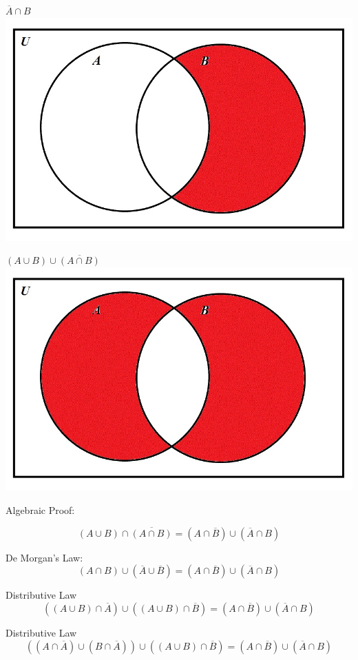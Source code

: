 \documentclass[10pt]{article}
\begin{document}
$\overline{A} \cap B$\\
\includegraphics[scale=0.3]{8}

$(A \cup B) \cup \overline{(A \cap B)}$\\
\includegraphics[scale=0.3]{4}

Algebraic Proof:

$$(A \cup B) \cap \overline{(A \cap B )}  = (A \cap \overline{B}) \cup (\overline{A} \cap B)$$

De Morgan's Law:
$$(A \cap B) \cup (\overline{A} \cup \overline{B}) = (A \cap \overline{B}) \cup (\overline{A} \cap B)$$

Distributive Law
$$((A \cup B) \cap \overline{A}) \cup ((A \cup B) \cap \overline{B}) = (A \cap \overline{B}) \cup (\overline{A} \cap B)$$

Distributive Law
$$((A \cap \overline{A}) \cup (B \cap \overline{A})) \cup ((A \cup B) \cap \overline{B}) = (A \cap \overline{B}) \cup (\overline{A} \cap B)$$
\end{document}
